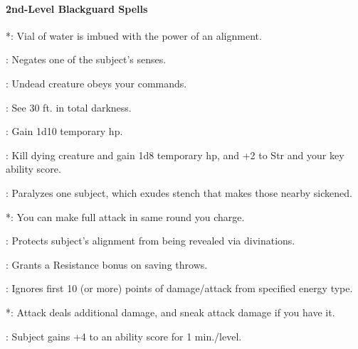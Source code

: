 \paragraph{2nd-Level Blackguard Spells}
\begin{list}{}{\leftmargin=1em}
\item {}*: Vial of water is imbued with the power of an alignment.
\item {}: Negates one of the subject's senses. %
\item {}: Undead creature obeys your commands. %
\item {}: See 30 ft. in total darkness. %
\item {}: Gain 1d10 temporary hp. %
\item {}: Kill dying creature and gain 1d8 temporary hp, and +2 to Str and your key ability score. %
\item {}: Paralyzes one subject, which exudes stench that makes those nearby sickened. %
\item {}*: You can make full attack in same round you charge.
\item {}: Protects subject's alignment from being revealed via divinations.
\item {}: Grants a Resistance bonus on saving throws.
\item {}: Ignores first 10 (or more) points of damage/attack from specified energy type.
\item {}*: Attack deals additional damage, and sneak attack damage if you have it. %
\item {}: Subject gains +4 to an ability score for 1 min./level.
\end{list}
